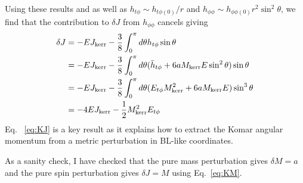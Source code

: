 \documentclass[aps,prd,amsmath,showpacs,amssymb,superscriptaddress,nofootinbib,longbibliography,eqsecnum,preprintnumbers]{revtex4-1}
\newcommand{\zach}[1]{\textcolor{ForestGreen}{#1}}
\begin{document}
Using these results and as well as $h_{t\phi}\sim h_{t\phi(0)}/r$ and $h_{\phi\phi}\sim h_{\phi\phi(0)}r^2\sin^2\theta$, we find that the contribution to $\delta J$ from $h_{\phi \phi}$ cancels giving
\begin{align}
\delta J &= -E J_{\rm kerr} -\frac{3}{8}\int_{0}^\pi d\theta  h_{t\phi}\sin\theta \nonumber \\
&=  -E J_{\rm kerr} -\frac{3}{8}\int_{0}^\pi d\theta  (\bar h_{t\phi}+6aM_{\rm kerr}E\sin^2\theta)\sin\theta \nonumber \\
&=  -E J_{\rm kerr} -\frac{3}{8}\int_{0}^\pi d\theta  (E_{t\phi}M_{\rm kerr}^2 +6aM_{\rm kerr}E)\sin^3\theta \nonumber \\
&=-4E J_{\rm kerr}-\frac{1}{2}M_{\rm kerr}^2E_{t\phi} \label{eq:KJ}
\end{align}
Eq. ~\eqref{eq:KJ} is a key result as it explains how to extract the Komar angular momentum from a metric perturbation in BL-like coordinates.

As a sanity check, I have checked that the pure mass perturbation gives $\delta M =a$ and the pure spin perturbation gives $\delta J =M$ using Eq.~\eqref{eq:KM}. 
 
%
%
\end{document}
